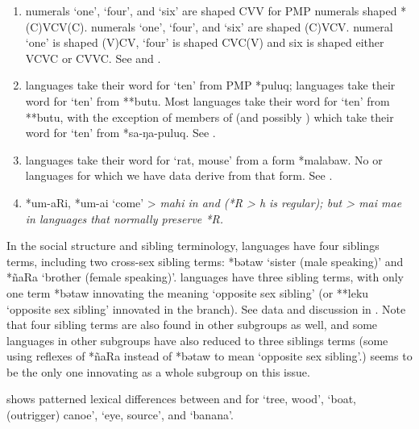 \begin{enumerate}
				and banana-term data from 311 languages in appendix \ref{ch:BanTer}.
	\item	{} numerals ‘one’,
				‘four’, and ‘six’ are shaped CVV for PMP numerals shaped *(C)VCV(C).
				 numerals ‘one’, ‘four’,
				and ‘six’ are shaped (C)VCV.
				 numeral ‘one’ is shaped (V)CV,
				‘four’ is shaped CVC(V)
				and six is shaped either VCVC or CVVC.
				See  and .
	\item	{} languages take their word for ‘ten’
				from PMP *puluq;  languages take their word
				for ‘ten’ from **butu.
				Most  languages take their word
				for ‘ten’ from **butu,
				with the exception of members of  (and possibly
				) which take their word for ‘ten’ from *sa-ŋa-puluq. See .
	\item	{} languages take their word for ‘rat,
				mouse’ from a form *malabaw.
				No  or  languages
				for which we have data derive from that form. See .
	\item	{} *um-aRi,
				*um-ai ‘come’ > \it{mahi} in 
				and  (*R > \it{h} is regular); but > \it{mai {\tl} mae}
				in  languages that normally preserve *R.
\end{enumerate}

In the social structure
and sibling terminology,  languages have four
siblings terms, including two cross-sex sibling terms: *bətaw ‘sister (male speaking)’
and *ñaRa ‘brother (female speaking)’.
 languages have three sibling terms,
with only one term *bətaw innovating the meaning ‘opposite sex
sibling’ (or **leku ‘opposite sex sibling’ innovated in the  branch).
See data and discussion in .
Note that four sibling terms are also found in other subgroups
as well, and some languages in other subgroups have also reduced to three
siblings terms (some using reflexes of *ñaRa instead of *bətaw
to mean ‘opposite sex sibling’.)  seems to be
the only one innovating as a whole subgroup on this issue.

 shows patterned lexical differences between 
and  for ‘tree,
wood’, ‘boat, (outrigger) canoe’, ‘eye,
source’, and ‘banana’.

